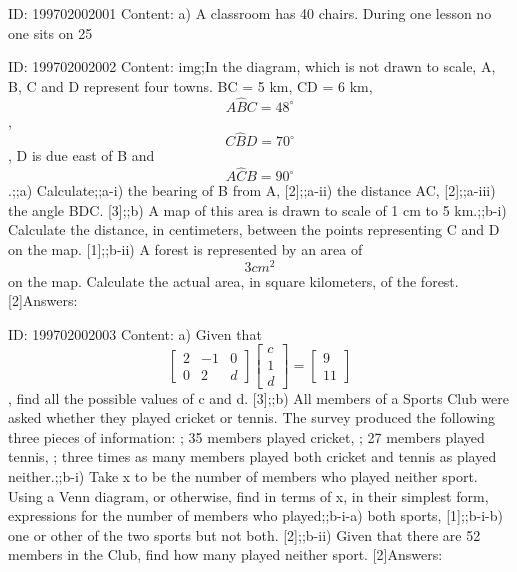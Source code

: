 \documentclass{article}
\begin{document}
ID: 199702002001
Content:
a) A classroom has 40 chairs. During one lesson no one sits on 25%

ID: 199702002002
Content:
img;In the diagram, which is not drawn to scale, A, B, C and D represent four towns. BC = 5 km, CD = 6 km, $$A \hat BC=48^{\circ}$$, $$C \hat BD=70^{\circ}$$, D is due east of B and $$A \hat CB=90^{\circ}$$.;;a) Calculate;;a-i) the bearing of B from A, [2];;a-ii) the distance AC, [2];;a-iii) the angle BDC. [3];;b) A map of this area is drawn to scale of 1 cm to 5 km.;;b-i) Calculate the distance, in centimeters, between the points representing C and D on the map. [1];;b-ii) A forest is represented by an area of $$3cm^{2} $$ on the map. Calculate the actual area, in square kilometers, of the forest. [2]Answers:

ID: 199702002003
Content:
a) Given that $$\begin{bmatrix}2&-1&0\\0&2&d\end{bmatrix}\begin{bmatrix}c\\1\\d\end{bmatrix}=\begin{bmatrix}9\\11\end{bmatrix}$$, find all the possible values of c and d. [3];;b) All members of a Sports Club were asked whether they played cricket or tennis. The survey produced the following three pieces of information: ; 35 members played cricket, ; 27 members played tennis, ; three times as many members played both cricket and tennis as played neither.;;b-i) Take x to be the number of members who played neither sport. Using a Venn diagram, or otherwise, find in terms of x, in their simplest form, expressions for the number of members who played;;b-i-a) both sports, [1];;b-i-b) one or other of the two sports but not both. [2];;b-ii) Given that there are 52 members in the Club, find how many played neither sport. [2]Answers:
\end{document}
